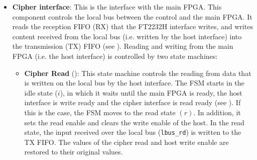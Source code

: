 \begin{itemize}
\begin{itemize}
	\end{itemize}
	\item \textbf{Cipher interface}: This is the interface with the main FPGA. This component controls the local bus between the control and the main FPGA.
	It reads the reception FIFO (RX) that the FT2232H interface writes, and writes content received from the local bus (i.e. written by the host interface) into the transmission (TX) FIFO (see ).
	Reading and writing from the main FPGA (i.e. the host interface) is controlled by two state machines: 
	\begin{figure}
		\centering
		\hspace{0.5cm}
		\label{fig: cipher_rw_fsm}
	\end{figure}
	\begin{itemize}
		\item \textbf{Cipher Read} (): This state machine controls the reading from data that is written on the local bus by the host interface. The FSM starts in the idle state ($i$), in which it waits until the main FPGA is ready, the host interface is write ready and the cipher interface is read ready (see ). If this is the case, the FSM moves to the read state $(r)$. In addition, it sets the read enable and clears the write enable of the host. In the read state, the input received over the local bus (\texttt{lbus_rd}) is written to the TX FIFO. The values of the cipher read and host write enable are restored to their original values.		
			

\end{itemize}
\end{itemize}
